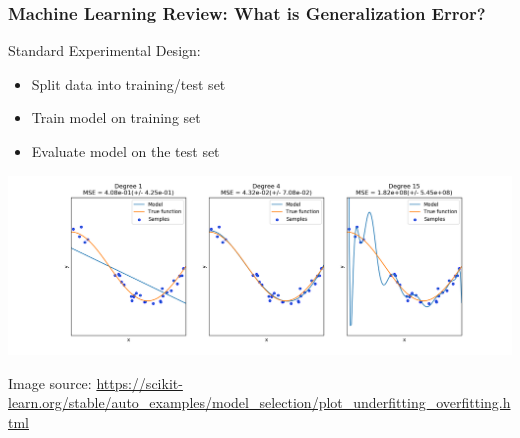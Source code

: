 \begin{frame}
\frametitle{Machine Learning Review: What is Generalization Error?}

Standard Experimental Design:
\begin{itemize}
\item Split data into training/test set
\item Train model on training set
\item Evaluate model on the test set
\end{itemize}


\includegraphics[width=\textwidth]{img/over-under-fit}

{
\fontsize{4}{4}
{\tiny Image source:} \url{https://scikit-learn.org/stable/auto_examples/model_selection/plot_underfitting_overfitting.html}
}
\end{frame}
